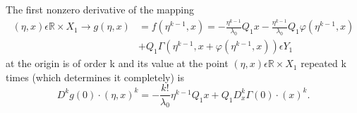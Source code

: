 \begin{proposition}\label{chap3-prop2.1}
The first nonzero derivative of the mapping
\begin{align*}
(\eta, x) \epsilon \mathbb{R} \times X_{1} \to g(\eta, x) & =
  f(\eta^{k-1}, x) = -\frac{\eta^{k-1}}{\lambda_{0}} Q_{1}x -
  \frac{\eta^{k-1}}{\lambda_{0}} Q_{1}\varphi (\eta^{k-1}, x) \tag{2.19}\label{chap3-eq2.19}\\
& + Q_{1}\Gamma(\eta^{k-1}, x+\varphi(\eta^{k-1}, x)) \epsilon Y_{1}
\end{align*}
at the origin is of order k and its value at the point $(\eta, x)
\epsilon \mathbb{R} \times X_{1}$ repeated k times (which determines
it completely) is
\begin{equation*}
D^{k}g(0) \cdot (\eta, x)^{k} = -\frac{k!}{\lambda_{0}} \eta^{k-1}
Q_{1} x + Q_{1}D_{x}^{k} \Gamma(0) \cdot (x)^{k}.\tag{2.20}\label{chap3-eq2.20}
\end{equation*}
\end{proposition}

